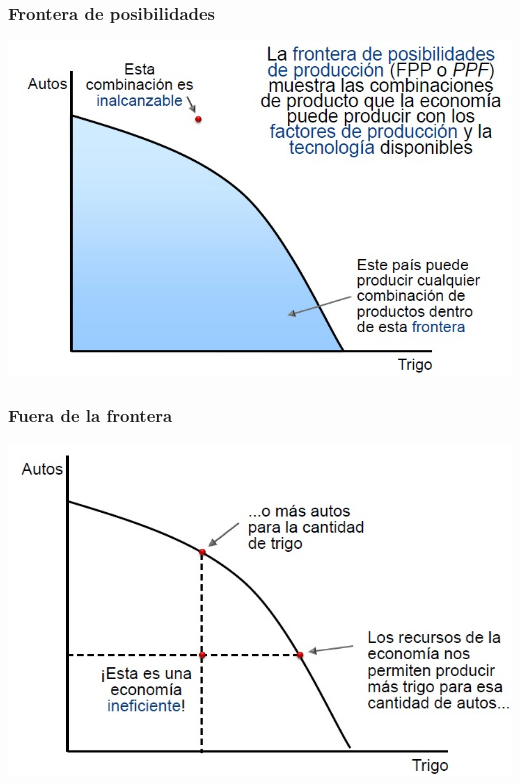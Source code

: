 \documentclass{beamer}
\begin{document}
\begin{frame}
\frametitle{Frontera de posibilidades}
\begin{center}
    \includegraphics[scale=0.55]{Tema_11.4_fronteradeposibilidades.jpg}
\end{center}
\end{frame}

\begin{frame}
\frametitle{Fuera de la frontera}
\begin{center}
    \includegraphics[scale=0.6]{Tema_11.5_fueradelafrontera.jpg}
\end{center}
\end{frame}
\end{document}
